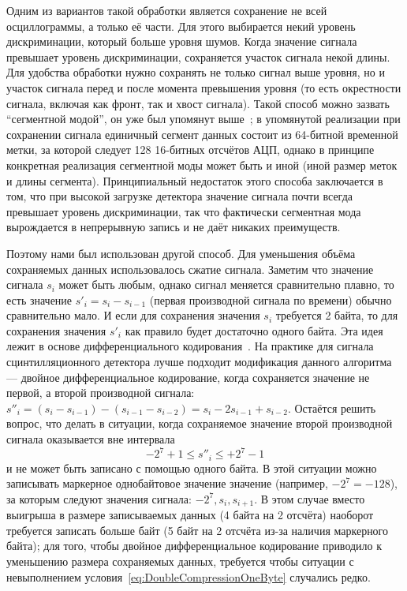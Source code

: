 Одним из вариантов такой обработки является сохранение не всей осциллограммы, а только её части. Для этого выбирается некий уровень дискриминации, который больше уровня шумов. Когда значение сигнала превышает уровень дискриминации, сохраняется участок сигнала некой длины. Для удобства обработки нужно сохранять не только сигнал выше уровня, но и участок сигнала перед и после момента превышения уровня (то есть окрестности сигнала, включая как фронт, так и хвост сигнала). Такой способ можно зазвать ``сегментной модой'', он уже был упомянут выше~\cite{Pereira2008}; в упомянутой реализации при сохранении сигнала единичный сегмент данных состоит из 64-битной временной метки, за которой следует 128 16-битных отсчётов АЦП, однако в принципе конкретная реализация сегментной моды может быть и иной (иной размер меток и длины сегмента). Принципиальный недостаток этого способа заключается в том, что при высокой загрузке детектора значение сигнала почти всегда превышает уровень дискриминации, так что фактически сегментная мода вырождается в непрерывную запись и не даёт никаких преимуществ.
 
Поэтому нами был использован другой способ. Для уменьшения объёма сохраняемых данных использовалось сжатие сигнала. Заметим что значение сигнала $s_i$ может быть любым, однако сигнал меняется сравнительно плавно, то есть значение $s'_i = s_i - s_{i-1}$ (первая производной сигнала по времени) обычно сравнительно мало. И если для сохранения значения $s_i$ требуется 2 байта, то для сохранения значения $s'_i$ как правило будет достаточно одного байта. Эта идея лежит в основе дифференциального кодирования~\cite{Sayood2012}. На практике для сигнала сцинтилляционного детектора лучше подходит модификация данного алгоритма --- двойное дифференциальное кодирование, когда сохраняется значение не первой, а второй производной сигнала: $s''_i = (s_i - s_{i-1}) - (s_{i-1} - s_{i-2}) = s_i - 2 s_{i-1} + s_{i-2}$. Остаётся решить вопрос, что делать в ситуации, когда сохраняемое значение второй производной сигнала оказывается вне интервала 
\begin{equation}
  \label{eq:DoubleCompressionOneByte}
  -2^{7}+1 \le s''_i \le +2^7-1 
\end{equation}
и не может быть записано с помощью одного байта. В этой ситуации можно записывать маркерное однобайтовое значение значение (например, $-2^7 = -128$), за которым следуют значения сигнала: $ -2^7, s_i, s_{i+1} $. В этом случае вместо выигрыша в размере записываемых данных (4 байта на 2 отсчёта) наоборот требуется записать больше байт (5 байт на 2 отсчёта из-за наличия маркерного байта); для того, чтобы двойное дифференциальное кодирование приводило к уменьшению размера сохраняемых данных, требуется чтобы ситуации с невыполнением условия~\ref{eq:DoubleCompressionOneByte} случались редко.~\cite{Khilkevich2019Dvp}

